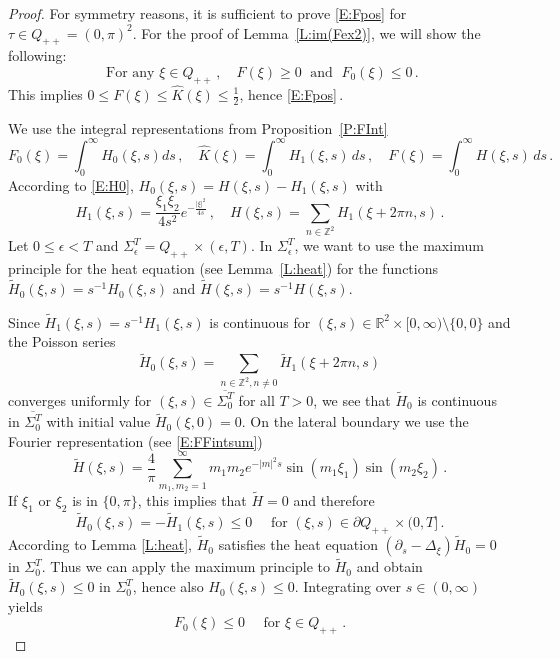 \documentclass[12pt]{amsart}
\theoremstyle{definition}
\theoremstyle{remark}
\numberwithin{equation}{section}
\newcommand\R{{\mathbb R}}
\newcommand\Z{{\mathbb Z}}
\let\hat=\widehat
\begin{document}
\begin{proof}
For symmetry reasons, it is sufficient to prove \eqref{E:Fpos} for $\tau\in Q_{++}=(0,\pi)^{2}$.
For the proof of Lemma~\ref{L:im(Fex2)}, we will show the following:
\begin{equation}
\label{E:FposF0neg}
\mbox{ For any }\xi\in Q_{++}\,,\quad
F(\xi)\ge0 \;\mbox{ and } \; F_{0}(\xi)\le0\,.
\end{equation}
This implies $0\le F(\xi)\le \hat K(\xi)\le\frac12$, hence \eqref{E:Fpos}\,.

We use the integral representations from Proposition~\ref{P:FInt}
\begin{equation}
\label{E:F0Int}
 F_{0}(\xi) = \int_{0}^{\infty} H_{0}(\xi,s)ds\,,\quad
 \hat K(\xi) = \int_{0}^{\infty} H_{1}(\xi,s)\,ds\,,\quad
 F(\xi) = \int_{0}^{\infty} H(\xi,s)\,ds\,.
\end{equation}
According to \eqref{E:H0}, $H_{0}(\xi,s)=H(\xi,s)-H_{1}(\xi,s)$ with
\begin{equation}
\label{E:H0H1Ex2}
 H_{1}(\xi,s)= \frac{\xi_{1}\xi_{2}}{4s^{2}} e^{-\frac{|\xi|^{2}}{4s}}\,,\quad
 H(\xi,s)=  \sum_{n\in\Z^{2}} H_{1}(\xi+2\pi n,s)\,.
\end{equation}
Let $0\le\epsilon<T$ and $\Sigma_{\epsilon}^{T}=Q_{++}\times (\epsilon,T)$.
In $\Sigma_{\epsilon}^{T}$, we want to use the maximum principle for the heat equation (see Lemma~\ref{L:heat}) for the functions 
$\tilde H_{0}(\xi,s)=s^{-1}H_{0}(\xi,s)$ and $\tilde H(\xi,s)=s^{-1}H(\xi,s)$. 

Since $\tilde H_{1}(\xi,s)=s^{-1}H_{1}(\xi,s)$ is continuous for $(\xi,s)\in\R^{2}\times[0,\infty)\setminus\{0,0\}$ and the Poisson series 
$$
 \tilde H_{0}(\xi,s) =  \sum_{n\in\Z^{2},n\ne0} \tilde H_{1}(\xi+2\pi n,s)
$$
converges uniformly for $(\xi,s)\in\overline{\Sigma_{0}^{T}}$ for all $T>0$, we see that 
$\tilde H_{0}$ is continuous in $\overline{\Sigma_{0}^{T}}$ with initial value 
$\tilde H_{0}(\xi,0)=0$. 
On the lateral boundary we use the Fourier representation (see \eqref{E:FFintsum})
$$
 \tilde H(\xi,s) = \frac4\pi \sum_{m_{1},m_{2}=1}^{\infty}
    m_{1}m_{2} e^{-|m|^{2}s}
    \sin (m_{1}\xi_{1}) \sin(m_{2}\xi_{2})\,.
$$
If $\xi_{1}$ or $\xi_{2}$ is in $\{0,\pi\}$, this implies that $\tilde H=0$ and therefore
$$
 \tilde H_{0}(\xi,s) = -\tilde H_{1}(\xi,s)\le0 
 \quad\mbox{ for }(\xi,s)\in\partial Q_{++}\times(0,T]\,.
$$
According to Lemma \ref{L:heat}, $\tilde H_{0}$ satisfies the heat equation
$(\partial_{s}-\Delta_{\xi})\tilde H_{0}=0$ in $\Sigma_{0}^{T}$.
Thus we can apply the maximum principle to $\tilde H_{0}$ and obtain 
$\tilde H_{0}(\xi,s)\le0$ in $\Sigma_{0}^{T}$, hence also $H_{0}(\xi,s)\le0$.
Integrating over $s\in(0,\infty)$ yields
$$
 F_{0}(\xi) \le 0 \quad\mbox{ for }\xi\in Q_{++}\,.
$$


\end{proof}
\end{document}
